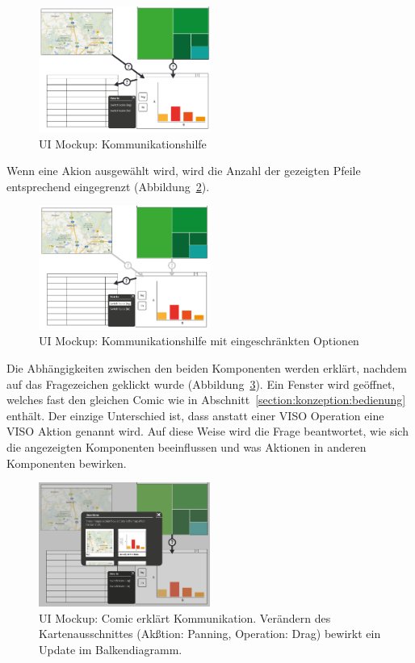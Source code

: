 \documentclass[
	headsepline,
	footsepline,
	fontsize=12pt,
	bibliography=totoc
]{scrbook}
\begin{document}
\begin{figure}[htbp]
   \centering
   \includegraphics[width=0.5\textwidth]{images/konzeption-kommunikation-step1.png}
   \caption{UI Mockup: Kommunikationshilfe}
   \label{figure:kommunikation-step1}
\end{figure}

Wenn eine Akion ausgewählt wird, wird die Anzahl der gezeigten Pfeile entsprechend eingegrenzt (Abbildung~\ref{figure:kommunikation-step2}).

\begin{figure}[htbp]
   \centering
   \includegraphics[width=0.5\textwidth]{images/konzeption-kommunikation-step2.png}
   \caption{UI Mockup: Kommunikationshilfe mit eingeschränkten Optionen}
   \label{figure:kommunikation-step2}
\end{figure}

Die Abhängigkeiten zwischen den beiden Komponenten werden erklärt, nachdem auf das Fragezeichen geklickt wurde (Abbildung~\ref{figure:kommunikation-step3}). Ein Fenster wird geöffnet, welches fast den gleichen Comic wie in Abschnitt~\ref{section:konzeption:bedienung} enthält. Der einzige Unterschied ist, dass anstatt einer VISO Operation eine VISO Aktion genannt wird. Auf diese Weise wird die Frage beantwortet, wie sich die angezeigten Komponenten beeinflussen und was Aktionen in anderen Komponenten bewirken.

\begin{figure}[htbp]
   \centering
   \includegraphics[width=0.5\textwidth]{images/konzeption-kommunikation-step3.png}
   \caption{UI Mockup: Comic erklärt Kommunikation. Verändern des Kartenausschnittes (Akßtion: Panning, Operation: Drag) bewirkt ein Update im Balkendiagramm.}
   \label{figure:kommunikation-step3}
\end{figure}
\end{document}
